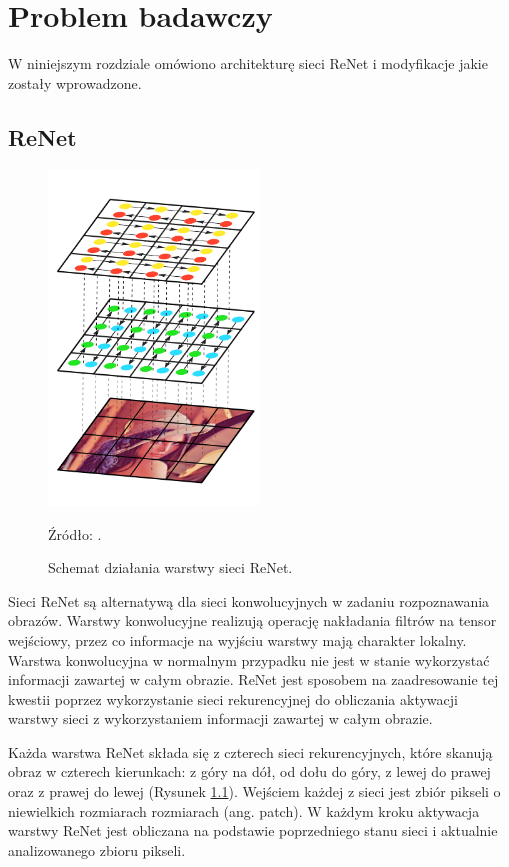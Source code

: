 \documentclass[oneside, mag]{mgr}
\begin{document}
\chapter{Problem badawczy}

W niniejszym rozdziale omówiono architekturę sieci ReNet i modyfikacje jakie zostały wprowadzone.

\section{ReNet}

\begin{figure}
\centering
	\includegraphics[width=0.5\textwidth]{img/ReNet.png}
	\caption{Schemat działania warstwy sieci ReNet.} Źródło: \cite{DBLP:journals/corr/VisinKCMCB15}.
	\label{fig:ReNet-single-layer}
\end{figure}

Sieci ReNet \cite{DBLP:journals/corr/VisinKCMCB15} są alternatywą dla sieci konwolucyjnych w zadaniu rozpoznawania obrazów. Warstwy konwolucyjne realizują operację nakładania filtrów na tensor wejściowy, przez co informacje na wyjściu warstwy mają charakter lokalny. Warstwa konwolucyjna w normalnym przypadku nie jest w stanie wykorzystać informacji zawartej w całym obrazie. ReNet jest sposobem na zaadresowanie tej kwestii poprzez wykorzystanie sieci rekurencyjnej do obliczania aktywacji warstwy sieci z wykorzystaniem informacji zawartej w całym obrazie.

Każda warstwa ReNet składa się z czterech sieci rekurencyjnych, które skanują obraz w czterech kierunkach: z góry na dół, od dołu do góry, z lewej do prawej oraz z prawej do lewej (Rysunek \ref{fig:ReNet-single-layer}). Wejściem każdej z sieci jest zbiór pikseli o niewielkich rozmiarach rozmiarach (ang. patch). W każdym kroku aktywacja warstwy ReNet jest obliczana na podstawie poprzedniego stanu sieci i aktualnie analizowanego zbioru pikseli. 
\end{document}
